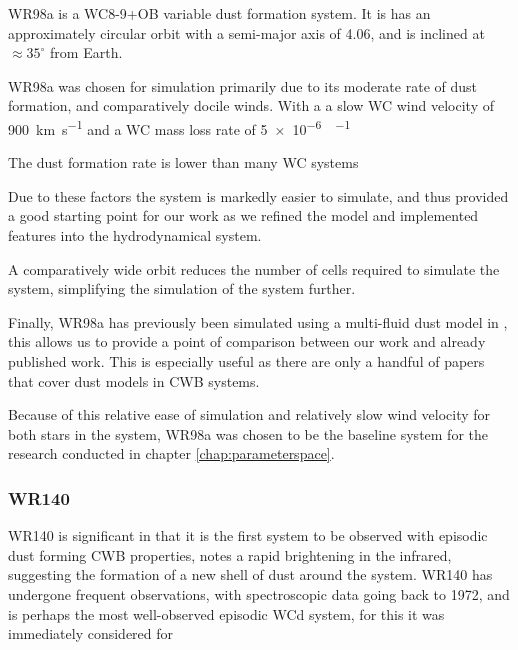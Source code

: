 WR98a is a WC8-9+OB variable dust formation system.
It is has an approximately circular orbit with a semi-major axis of \SI{4.06}{\au}, and is inclined at $\approx 35^\circ$ from Earth.



\parencite{monnierPinwheelNebulaWR1999}



WR98a was chosen for simulation primarily due to its moderate rate of dust formation, and comparatively docile winds.
With a a slow WC wind velocity of \SI{900}{\kilo\metre\per\second} and a WC mass loss rate of \SI{5e-6}{\solarmass\per\year}



The dust formation rate is lower than many WC systems \parencite{lauRevisitingImpactDust2020}

Due to these factors the system is markedly easier to simulate, and thus provided a good starting point for our work as we refined the model and implemented features into the hydrodynamical system.

A comparatively wide orbit reduces the number of cells required to simulate the system, simplifying the simulation of the system further.

Finally, WR98a has previously been simulated using a multi-fluid dust model in \textcite{hendrix_pinwheels_2016}, this allows us to provide a point of comparison between our work and already published work.
This is especially useful as there are only a handful of papers that cover dust models in CWB systems.



Because of this relative ease of simulation and relatively slow wind velocity for both stars in the system, WR98a was chosen to be the baseline system for the research conducted in chapter \ref{chap:parameterspace}.

\subsubsection{WR140}


WR140 is significant in that it is the first system to be observed with episodic dust forming CWB properties, \textcite{williamsCondensationShellHD1978} notes a rapid brightening in the infrared, suggesting the formation of a new shell of dust around the system.
WR140 has undergone frequent observations, with spectroscopic data going back to 1972, and is perhaps the most well-observed episodic WCd system, for this it was immediately considered for 

